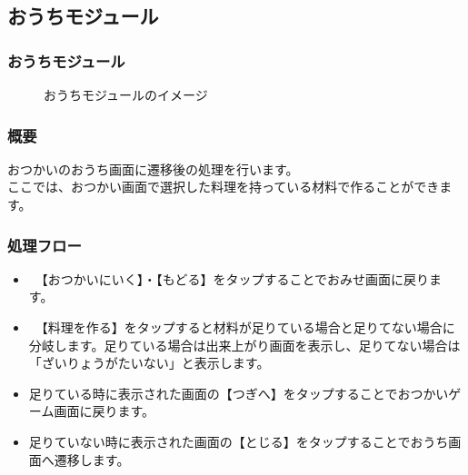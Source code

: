 \documentclass[a4j]{jarticle}
\begin{document}
\newpage
\subsection{おうちモジュール}
\subsubsection{おうちモジュール\label{おうち}}
\begin{figure}[H]
    \begin{center}
    \caption {おうちモジュールのイメージ}
    \label{functionselection}
    \end{center}
\end{figure}

\subsubsection*{概要}
おつかいのおうち画面に遷移後の処理を行います。\\
ここでは、おつかい画面で選択した料理を持っている材料で作ることができます。

\subsubsection*{処理フロー}
\begin{itemize}
\item　【おつかいにいく】・【もどる】をタップすることでおみせ画面に戻ります。
\item　【料理を作る】をタップすると材料が足りている場合と足りてない場合に分岐します。足りている場合は出来上がり画面を表示し、足りてない場合は「ざいりょうがたいない」と表示します。
\item 足りている時に表示された画面の【つぎへ】をタップすることでおつかいゲーム画面に戻ります。
\item 足りていない時に表示された画面の【とじる】をタップすることでおうち画面へ遷移します。
\end{itemize}
\end{document}
